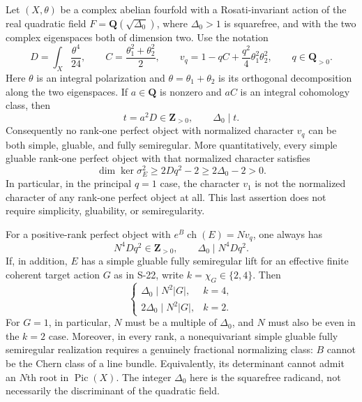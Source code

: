 \begin{theorem}
\label{thm:semireg-rm-integral-obstruction}
Let $(X,\theta)$ be a complex abelian fourfold with a
Rosati-invariant action of the real quadratic field
$F=\mathbf Q(\sqrt{\Delta_0})$, where $\Delta_0>1$ is
squarefree, and with the two complex eigenspaces both
of dimension two. Use the notation
\[
 D=\int_X\frac{\theta^4}{24},\qquad
 C=\frac{\theta_1^2+\theta_2^2}{2},\qquad
 v_q=1-qC+\frac{q^2}{4}\theta_1^2\theta_2^2,
 \qquad q\in\mathbf Q_{>0}.
\]
Here $\theta$ is an integral polarization and
$\theta=\theta_1+\theta_2$ is its orthogonal decomposition
along the two eigenspaces.
If $a\in\mathbf Q$ is nonzero and $aC$ is an integral
cohomology class, then
\[
 t=a^2D\in\mathbf Z_{>0},\qquad \Delta_0\mid t.
 \tag{S30.1}
\]
Consequently no rank-one perfect object with normalized
character $v_q$ can be both simple, gluable, and fully
semiregular. More quantitatively, every simple gluable
rank-one perfect object with that normalized character
satisfies
\[
 \dim\ker\sigma_E^2\ge2Dq^2-2\ge2\Delta_0-2>0.
 \tag{S30.2}
\]
In particular, in the principal $q=1$ case, the character
$v_1$ is not the normalized character of any rank-one
perfect object at all. This last assertion does not
require simplicity, gluability, or semiregularity.

For a positive-rank perfect object with
$e^B\operatorname{ch}(E)=Nv_q$, one always has
\[
 N^4Dq^2\in\mathbf Z_{>0},\qquad
 \Delta_0\mid N^4Dq^2.
 \tag{S30.3}
\]
If, in addition, $E$ has a simple gluable fully semiregular
lift for an effective finite coherent target action $G$
as in S-22, write $k=\chi_G\in\{2,4\}$. Then
\[
 \begin{cases}
 \Delta_0\mid N^2|G|,&k=4,\\
 2\Delta_0\mid N^2|G|,&k=2.
 \end{cases}
 \tag{S30.4}
\]
For $G=1$, in particular, $N$ must be a multiple of
$\Delta_0$, and $N$ must also be even in the $k=2$ case.
Moreover, in every rank, a nonequivariant simple gluable
fully semiregular realization requires a genuinely
fractional normalizing class: $B$ cannot be the Chern
class of a line bundle. Equivalently, its determinant
cannot admit an $N$th root in $\operatorname{Pic}(X)$.
The integer $\Delta_0$ here is the squarefree radicand,
not necessarily the discriminant of the quadratic field.
\end{theorem}
